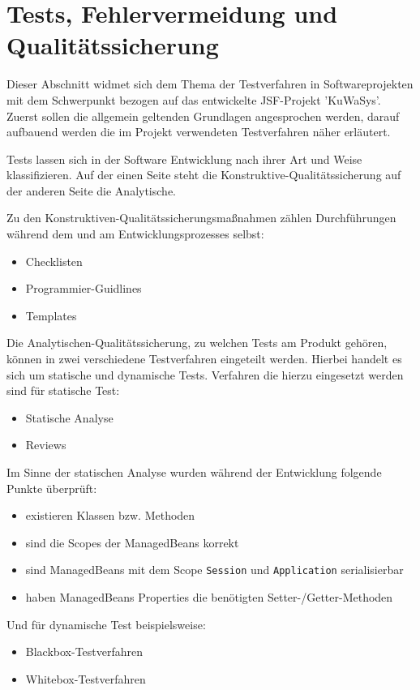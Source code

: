\section{Tests, Fehlervermeidung und Qualitätssicherung}\label{sec:Testing und Debugging}

Dieser Abschnitt widmet sich dem Thema der Testverfahren in Softwareprojekten mit dem Schwerpunkt bezogen auf das entwickelte JSF-Projekt 'KuWaSys'.
Zuerst sollen die allgemein geltenden Grundlagen angesprochen werden, darauf aufbauend werden die im Projekt verwendeten Testverfahren näher erläutert. 

Tests lassen sich in der Software Entwicklung nach ihrer Art und Weise klassifizieren.
Auf der einen Seite steht die Konstruktive-Qualitätssicherung auf der anderen Seite die Analytische.

Zu den Konstruktiven-Qualitätssicherungsmaßnahmen zählen Durchführungen während dem und am Entwicklungsprozesses selbst:
\begin{itemize}
  \item Checklisten
  \item Programmier-Guidlines
  \item Templates
\end{itemize}

Die Analytischen-Qualitätssicherung, zu welchen Tests am Produkt gehören, können in zwei verschiedene Testverfahren eingeteilt werden. Hierbei handelt es sich um statische und dynamische Tests.
Verfahren die hierzu eingesetzt werden sind für statische Test:
\begin{itemize}
  \item Statische Analyse
  \item Reviews
\end{itemize}

Im Sinne der statischen Analyse wurden während der Entwicklung folgende Punkte überprüft:
\begin{itemize}
  \item existieren Klassen bzw. Methoden
  \item sind die Scopes der ManagedBeans korrekt
  \item sind ManagedBeans mit dem Scope \texttt{Session} und \texttt{Application} serialisierbar
  \item haben ManagedBeans Properties die benötigten Setter-/Getter-Methoden
\end{itemize}

Und für dynamische Test beispielsweise:
\begin{itemize}
  \item \gls{Blackbox}-Testverfahren
  \item \gls{Whitebox}-Testverfahren
\end{itemize}


